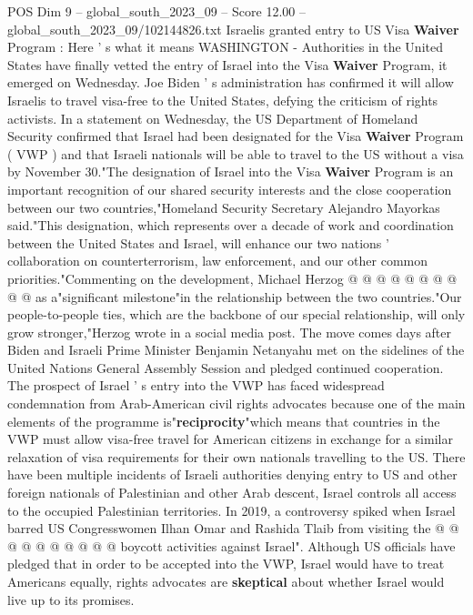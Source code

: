 \begin{textsample}{POS Dim 9 – global\_south\_2023\_09 – Score 12.00 – global\_south\_2023\_09/102144826.txt}  \label{ex:f9_pos_001}
Israelis granted entry to US Visa \textbf{Waiver} Program : Here ' s what it means WASHINGTON - Authorities in the United States have finally vetted the entry of Israel into the Visa \textbf{Waiver} Program, it emerged on Wednesday.
Joe Biden ' s administration has confirmed it will allow Israelis to travel visa-free to the United States, defying the criticism of rights activists.
In a statement on Wednesday, the US Department of Homeland Security confirmed that Israel had been designated for the Visa \textbf{Waiver} Program ( VWP ) and that Israeli nationals will be able to travel to the US without a visa by November 30."The designation of Israel into the Visa \textbf{Waiver} Program is an important recognition of our shared security interests and the close cooperation between our two countries,"Homeland Security Secretary Alejandro Mayorkas said."This designation, which represents over a decade of work and coordination between the United States and Israel, will enhance our two nations ' collaboration on counterterrorism, law enforcement, and our other common priorities."Commenting on the development, Michael Herzog @ @ @ @ @ @ @ @ @ @ as a"significant milestone"in the relationship between the two countries."Our people-to-people ties, which are the backbone of our special relationship, will only grow stronger,"Herzog wrote in a social media post.
The move comes days after Biden and Israeli Prime Minister Benjamin Netanyahu met on the sidelines of the United Nations General Assembly Session and pledged continued cooperation.
The prospect of Israel ' s entry into the VWP has faced widespread condemnation from Arab-American civil rights advocates because one of the main elements of the programme is"\textbf{reciprocity}"which means that countries in the VWP must allow visa-free travel for American citizens in exchange for a similar relaxation of visa requirements for their own nationals travelling to the US.
There have been multiple incidents of Israeli authorities denying entry to US and other foreign nationals of Palestinian and other Arab descent, Israel controls all access to the occupied Palestinian territories.
In 2019, a controversy spiked when Israel barred US Congresswomen Ilhan Omar and Rashida Tlaib from visiting the @ @ @ @ @ @ @ @ @ @ boycott activities against Israel".
Although US officials have pledged that in order to be accepted into the VWP, Israel would have to treat Americans equally, rights advocates are \textbf{skeptical} about whether Israel would live up to its promises.

\end{textsample}
